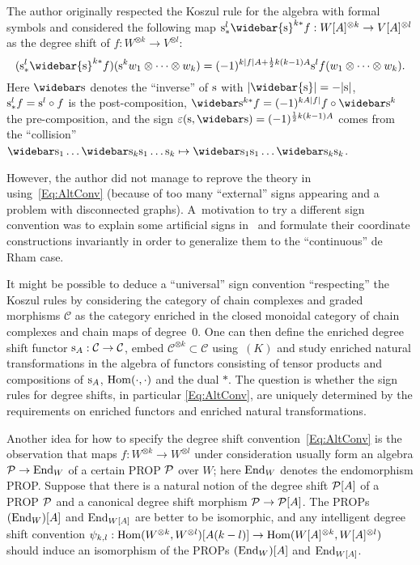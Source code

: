 \documentclass[\MainFolder/Text.tex]{subfiles}
\begin{document}
\begin{Remark}
The author originally respected the Koszul rule for the algebra with formal symbols and considered the following map $\Susp^{l}_*\widebar{\Susp}^{k*} f: W[A]^{\otimes k} \rightarrow V[A]^{\otimes l}$ as the degree shift of $f: W^{\otimes k} \rightarrow V^{\otimes l}$:
\begin{equation}\label{Eq:AltConv}
(\Susp^{l}_*\widebar{\Susp}^{k*} f)(\Susp^{k} w_1 \otimes \dotsb \otimes w_k ) = (-1)^{k \Abs{f}A + \frac{1}{2}k(k-1) A} \Susp^l f(w_1 \otimes \dotsb \otimes w_k).
\end{equation}
Here $\DeSusp$ denotes the ``inverse'' of $\mathrm{s}$ with $\Abs{\widebar{\Susp}} = - \Abs{\Susp}$, $\mathrm{s}_*^l f = \mathrm{s}^l \circ f$ is the post-composition, $\DeSusp^{k*}f = (-1)^{k A \Abs{f}} f\circ \DeSusp^k$ the pre-composition, and the sign $ \varepsilon(\Susp, \DeSusp) = (-1)^{\frac{1}{2}k(k-1)A}$ comes from the ``collision'' $\DeSusp_1\dots \DeSusp_k \Susp_1 \dots \Susp_k \mapsto \DeSusp_1 \Susp_1 \dots \DeSusp_k \Susp_k$. 

However, the author did not manage to reprove the theory in~\cite{Cieliebak2015} using~\eqref{Eq:AltConv} (because of too many ``external'' signs appearing and a problem with disconnected graphs). A~motivation to try a different sign convention was to explain some artificial signs in~\cite{Cieliebak2015} and formulate their coordinate constructions invariantly in order to generalize them to the ``continuous'' de Rham case.

It might be possible to deduce a ``universal'' sign convention ``respecting'' the Koszul rules by considering the category of chain complexes and graded morphisms $\mathcal{C}$ as the category enriched in the closed monoidal category of chain complexes and chain maps of degree~$0$. One can then define the enriched degree shift functor $\mathrm{s}_{A}: \mathcal{C} \rightarrow \mathcal{C}$, embed $\mathcal{C}^{\otimes k} \subset \mathcal{C}$ using~$(K)$ and study enriched natural transformations in the algebra of functors consisting of tensor products and compositions of $\mathrm{s}_{A}$, $\mathrm{Hom}(\cdot, \cdot)$ and the dual $*$. The question is whether the sign rules for degree shifts, in particular  \eqref{Eq:AltConv}, are uniquely determined by the requirements on enriched functors and enriched natural transformations.

Another idea for how to specify the degree shift convention~\eqref{Eq:AltConv} is the observation that maps $f: W^{\otimes k}\rightarrow W^{\otimes l}$ under consideration usually form an algebra $\mathcal{P} \rightarrow \mathrm{End}_W$ of a certain PROP $\mathcal{P}$ over $W$; here $\mathrm{End}_W$ denotes the endomorphism PROP. Suppose that there is a natural notion of the degree shift $\mathcal{P}[A]$ of a PROP $\mathcal{P}$ and a canonical degree shift morphism $\mathcal{P} \rightarrow \mathcal{P}[A]$. The PROPs $(\mathrm{End}_W)[A]$ and $\mathrm{End}_{W[A]}$ are better to be isomorphic, and any intelligent degree shift convention $\psi_{k,l}: \mathrm{Hom}(W^{\otimes k},W^{\otimes l})[A(k-l)] \rightarrow \mathrm{Hom}(W[A]^{\otimes k},W[A]^{\otimes l})$ should induce an isomorphism of the PROPs $(\mathrm{End}_W)[A]$ and $\mathrm{End}_{W[A]}$.
\end{Remark}
\end{document}
